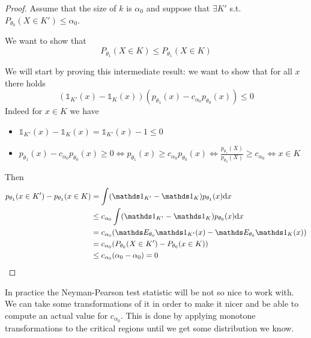 \documentclass[12pt]{extarticle}
\begin{document}
\begin{proof}
	Assume that the size of $k$ is $\alpha_0$ and
	suppose that $\exists K'$ s.t. $P_{\theta_0}(X \in K')\leq \alpha_0$.

	We want to show that
	\begin{equation}
		P_{\theta_1}(X \in K) \leq P_{\theta_1}(X \in K)
	\end{equation}

	We will start by proving this intermediate result:
	we want to show that for all $x$ there holds
	\begin{equation}
		(\mathds 1_{K'}(x) - \mathds 1_{K}(x))(p_{\theta_1}(x) - c_{\alpha_0}p_{\theta_0}(x)) \leq 0
	\end{equation}
	Indeed for $x \in K$ we have
	\begin{itemize}
		\item $\mathds 1_{K'}(x) - \mathds 1_{K}(x) = \mathds 1_{K'}(x) -1 \leq 0$
		\item $p_{\theta_1}(x) - c_{\alpha_0}p_{\theta_0}(x) \geq 0 \iff p_{\theta_1}(x) \geq c_{\alpha_0}p_{\theta_0}(x) \iff \frac{p_{\theta_1}(X)}{p_{\theta_0}(X)} \geq c_{\alpha_0} \iff x \in K$
	\end{itemize}

	Then
	\begin{align}
		p_{\theta_1}(x \in K') - p_{\theta_1}(x \in K) & = \int (\mathds 1_{K'} - \mathds 1_{K}) p_{\theta_1}(x) \dd x                   \\
		                                               & \leq c_{\alpha_0} \int (\mathds 1_{K'} - \mathds 1_{K}) p_{\theta_0}(x) \dd x   \\
		                                               & = c_{\alpha_0} (\E_{\theta_0} \mathds 1_{K'}(x) - \E_{\theta_0} \mathds 1_K(x)) \\
		                                               & = c_{\alpha_0} (P_{\theta_0}(X \in K') - P_{\theta_0}(x \in K))                 \\
		                                               & \leq c_{\alpha_0} (\alpha_0 - \alpha_0) = 0
	\end{align}
\end{proof}

In practice the Neyman-Pearson test statistic will be not so nice to work with.
We can take some transformations of it in order to make it nicer and
be able to compute an actual value for $c_{\alpha_0}$.
This is done by applying monotone transformations to the critical regions
until we get some distribution we know.
\end{document}
